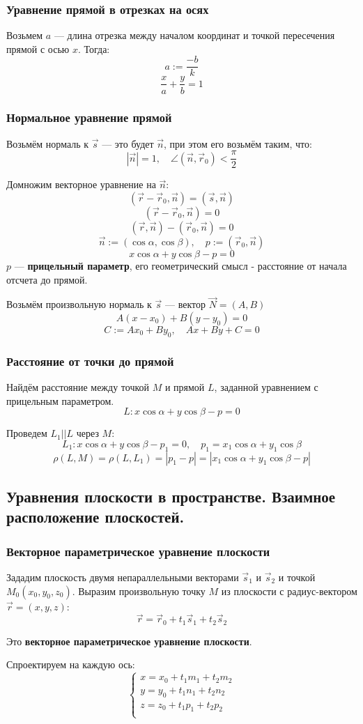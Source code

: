 \subsubsection{Уравнение прямой в отрезках на осях}
Возьмем $a$ --- длина отрезка между началом координат и точкой пересечения прямой с осью $x$. Тогда:
$$a:=\frac{-b}{k}$$
$$\frac{x}{a}+\frac{y}{b}=1$$
\subsubsection{Нормальное уравнение прямой}
Возьмём нормаль к $\vec s$ --- это будет $\vec n$, при этом его возьмём таким, что:
$$|\vec n|=1, \quad \angle(\vec n, \vec r_0)<\frac{\pi}{2}$$

Домножим векторное уравнение на $\vec n$:
$$(\vec r-\vec r_0,\vec n)=(\vec s,\vec n)$$
$$(\vec r-\vec r_0,\vec n)=0$$
$$(\vec r,\vec n) - (\vec r_0,\vec n)=0$$
$$\vec n:=(\cos \alpha, \cos \beta), \quad p:=(\vec r_0, \vec n)$$
$$x\cos\alpha+y\cos\beta-p=0$$
$p$ --- \textbf{прицельный параметр}, его геометрический смысл - расстояние
от начала отсчета до прямой.

Возьмём произвольную нормаль к $\vec s$ --- вектор $\vec N=(A,B)$
$$A(x-x_0)+B(y-y_0)=0$$
$$C:=Ax_0+By_0,\quad Ax+By+C=0$$

\subsubsection{Расстояние от точки до прямой}
Найдём расстояние между точкой $M$ и прямой $L$, заданной уравнением с прицельным параметром.
$$L:x\cos\alpha+y\cos\beta-p=0$$

Проведем $L_1||L$ через $M$:
$$L_1:x\cos\alpha+y\cos\beta-p_1=0, \quad p_1=x_1\cos\alpha+y_1\cos\beta$$
$$\rho(L,M)=\rho(L,L_1)=|p_1-p|=|x_1\cos\alpha+y_1\cos\beta-p|$$

\subsection{Уравнения плоскости в пространстве. Взаимное расположение плоскостей.}
\subsubsection{Векторное параметрическое уравнение плоскости}
Зададим плоскость двумя непараллельными векторами $\vec s_1$ и $\vec s_2$ и точкой $M_0(x_0,y_0,z_0)$. Выразим произвольную точку $M$ из плоскости с радиус-вектором $\vec r=(x,y,z)$:
$$\vec r=\vec r_0+t_1\vec s_1+t_2\vec s_2$$
\begin{definition}
    Это \textbf{векторное параметрическое уравнение плоскости}.
\end{definition}
Спроектируем на каждую ось:
$$\begin{cases}
        x=x_0+t_1m_1+t_2m_2 \\
        y=y_0+t_1n_1+t_2n_2 \\
        z=z_0+t_1p_1+t_2p_2 \\
    \end{cases}$$

